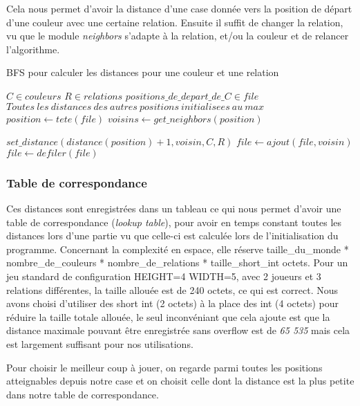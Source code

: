 Cela nous permet d'avoir la distance d'une case donnée vers la position de départ d'une couleur avec une certaine relation.
Ensuite il suffit de changer la relation, vu que le module \emph{neighbors} s'adapte à la relation,  et/ou la couleur et de relancer l'algorithme.

\begin{algorithm}
    \caption{BFS pour calculer les distances pour une couleur et une relation}\label{alg:cap}
    \label{alg:BFS}
    \begin{algorithmic}
        \Require $C \in couleurs$
        \Require $R \in relations$
        \Require $positions\_de\_depart\_de\_C \in file $
        \Require $Toutes\ les\ distances\ des\ autres\ positions\ initialisees\ au\ max$
        \State $position \gets tete(file)$
        \State $voisins \gets get\_neighbors(position)$

        \State $set\_distance(distance(position) + 1, voisin, C, R)$
        \State $file \gets ajout(file, voisin)$
        \EndIf
        \EndFor
        \State $file \gets defiler(file)$
        \EndWhile
    \end{algorithmic}
\end{algorithm}

\subsubsection{Table de correspondance}

Ces distances sont enregistrées dans un tableau ce qui nous permet d'avoir une table de correspondance (\emph{lookup table}),
pour avoir en temps constant toutes les distances lors d'une partie vu que celle-ci est calculée lors de l'initialisation
du programme. Concernant la complexité en espace, elle réserve
taille\_du\_monde * nombre\_de\_couleurs * nombre\_de\_relations * taille\_short\_int octets. Pour un jeu standard de configuration
HEIGHT=4 WIDTH=5, avec 2 joueurs et 3 relations différentes, la taille allouée est de 240 octets, ce qui est correct.
Nous avons choisi d'utiliser des short int (2 octets) à la place des int (4 octets) pour réduire la taille totale allouée,
le seul inconvéniant que cela ajoute est que la distance maximale pouvant être enregistrée sans overflow est de \emph{65 535} mais cela
est largement suffisant pour nos utilisations.

Pour choisir le meilleur coup à jouer, on regarde parmi toutes les positions atteignables depuis
notre case et on choisit celle dont la distance est la plus petite dans notre table de correspondance.

